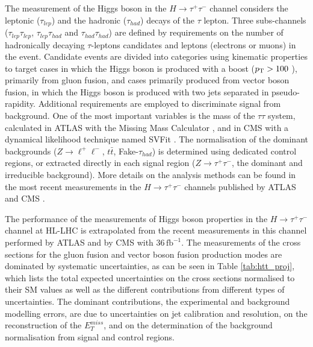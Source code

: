 


The measurement of the Higgs boson  in the $H \to \tau^{+}\tau^{-}$ channel considers the leptonic ($\tau_{lep}$) and the hadronic ($\tau_{had}$) decays of the $\tau$ lepton. Three subs-channels ($\tau_{lep}\tau_{lep}$, $\tau_{lep}\tau_{had}$ and $\tau_{had}\tau_{had}$) are defined by requirements on the number of hadronically decaying $\tau$-leptons candidates and leptons (electrons or muons) in the event.
Candidate events are divided into categories using kinematic properties to target cases in which the Higgs boson is produced with a  boost ($p\sb{\scriptstyle\mathrm{T}} > 100$ \UGeV), primarily from gluon  fusion, and cases primarily produced from vector boson fusion, in which the Higgs boson is produced with two jets separated in pseudo-rapidity. Additional requirements are employed to discriminate signal from background. One of the most important variables is the mass of the $\tau\tau$ system, calculated in ATLAS with the Missing Mass Calculator \cite{Elagin:2010aw}, and in CMS with a  dynamical likelihood technique named SVFit \cite{Bianchini:2014vza}.
The normalisation of the dominant backgrounds ($Z\to\ell^{+}\ell^{-}$, $t\bar{t}$, Fake-$\tau_{had}$) is determined using dedicated control regions, or extracted directly in each signal region ($Z\to\tau^{+}\tau^{-}$, the dominant and irreducible background).  More details on the analysis methods can be found in the most recent measurements in the  $H \to \tau^{+}\tau^{-}$ channels published by ATLAS \cite{Aaboud:2018pen} and CMS \cite{Sirunyan:2017khh}.

The performance of the measurements of Higgs boson properties in the $H \to \tau^{+}\tau^{-}$ channel at HL-LHC is extrapolated from the recent measurements in this channel performed by ATLAS \cite{ATLAS-CONF-2018-021} and by CMS \cite{Sirunyan:2017khh} with 36\,$\mathrm{fb}^{-1}$. 
The measurements of the cross sections for the gluon fusion and vector boson fusion production modes are dominated by systematic uncertainties, as can be seen in Table \ref{tab:htt_proj}, which  lists the total expected uncertainties on the cross sections normalised to their SM values as well as  the different contributions from different types of uncertainties. 
The dominant contributions, the experimental and background modelling errors, are due to uncertainties on jet calibration and resolution, on the reconstruction of the $E_{T}^{miss}$, and on the determination of the background normalisation from signal and control regions.

